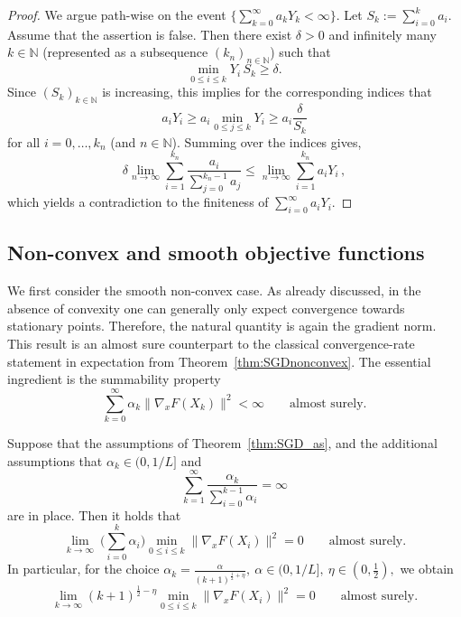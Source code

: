 \documentclass[12pt,openany]{book}
\theoremstyle{definition}
\theoremstyle{definition}
\newcommand{\N}{\mathbb{N}}
\begin{document}
\begin{proof}
We argue path-wise on the event $\{\sum_{k=0}^{\infty}a_kY_k<\infty\}$. Let
$
S_k:=\sum_{i=0}^{k}a_i.
$
Assume that the assertion is false. Then there exist $\delta>0$ and infinitely many $k\in\mathbb{N}$ (represented as a subsequence $(k_n)_{n\in\N}$) such that
\[
\min_{0\leq i\leq k}Y_i\, S_k \geq \delta.
\]
Since $(S_k)_{k\in\mathbb{N}}$ is increasing, this implies for the corresponding indices that
\[
a_iY_i\geq a_i\min_{0\le j\le k} Y_i\geq a_i\frac{\delta}{S_k}
\]
for all $i=0,\dots, k_n$ (and $n\in\N$). Summing over the indices gives, 
\[ \delta \lim_{n\to\infty} \sum_{i=1}^{k_n}\frac{a_i}{\sum_{j=0}^{k_n-1}a_j} \le \lim_{n\to\infty} \sum_{i=1}^{k_n} a_i Y_i\,,\]
which yields a contradiction to the finiteness of $\sum_{i=0}^{\infty}a_iY_i$.
\end{proof}

\subsection{Non-convex and smooth objective functions}
We first consider the smooth non-convex case. As already discussed, in the absence of convexity one can generally only expect convergence towards stationary points. Therefore, the natural quantity is again the gradient norm. This result is an almost sure counterpart to the classical convergence-rate statement in expectation from Theorem~\ref{thm:SGDnonconvex}. The essential ingredient is the summability property
\[
\sum_{k=0}^{\infty}
\alpha_k\|\nabla_xF(X_k)\|^2<\infty
\qquad \text{almost surely}.
\]
\begin{thm}
Suppose that the assumptions of Theorem~\ref{thm:SGD_as}, and the additional assumptions that $\alpha_k\in(0,1/L]$ and 
\[ \sum_{k=1}^{\infty}
 \frac{\alpha_k}{\sum_{i=0}^{k-1}\alpha_i}
 =
 \infty
\]
are in place. Then it holds that
\[
\lim_{k\to\infty}\ \Big(\sum_{i=0}^{k}\alpha_i\Big)\min_{0\leq i\leq k}\|\nabla_xF(X_i)\|^2
=
0
\qquad \text{almost surely}.
\]
In particular, for the choice
$
\alpha_k=\frac{\alpha}{(k+1)^{\frac12+\eta}},
\
\alpha\in(0,1/L],\ \eta\in(0,\tfrac12),
$
we obtain
\[
\lim_{k\to\infty} (k+1)^{\frac12-\eta}\min_{0\leq i\leq k}\|\nabla_xF(X_i)\|^2
=0
\qquad \text{almost surely}.
\]
\end{thm}
\end{document}
